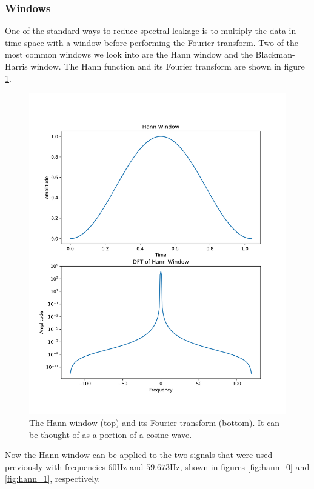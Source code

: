 \documentclass[11pt, letterpage]{article}
\begin{document}
\subsubsection{Windows}
One of the standard ways to reduce spectral leakage is to multiply the data in
time space with a window before performing the Fourier transform. Two of the
most common windows we look into are the Hann window and the Blackman-Harris
window. The Hann function and its Fourier transform are shown in figure
\ref{fig:hann_window}.

\begin{figure}
  \includegraphics[width=\linewidth]{hann_window.png}
  \caption{
    The Hann window (top) and its Fourier transform (bottom). It can be thought
    of as a portion of a cosine wave.
  }
  \label{fig:hann_window}
\end{figure}

Now the Hann window can be applied to the two signals that were used previously
with frequencies $60$Hz and $59.673$Hz, shown in figures \ref{fig:hann_0} and
\ref{fig:hann_1}, respectively. 
\end{document}
